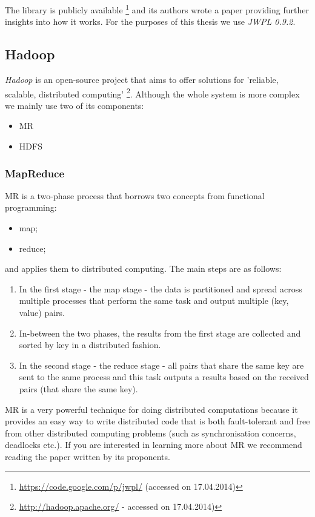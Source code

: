 The library is publicly available
\footnote{\url{https://code.google.com/p/jwpl/} (accessed on 17.04.2014)} and
its authors wrote a paper \cite{zesch2008jwpl} providing further insights into
how it works. For the purposes of this thesis we use \emph{\ac{JWPL} 0.9.2}.

\subsection{Hadoop}

\emph{Hadoop} is an open-source project that aims to offer solutions for
'reliable, scalable, distributed computing'
\footnote{\url{http://hadoop.apache.org/} - accessed on 17.04.2014)}.  Although
the whole system is more complex we mainly use two of its components:
\begin{itemize}
  \item \acl{MR}
  \item \acl{HDFS}
\end{itemize}

\subsubsection{MapReduce}

\acf{MR} is a two-phase process that borrows two concepts from functional
programming:
\begin{itemize}
  \item map;
  \item reduce;
\end{itemize}
and applies them to distributed computing.
The main steps are as follows:
\begin{enumerate}
  \item In the first stage - the map stage - the data is partitioned and spread
  across multiple processes that perform the same task and output multiple
  (key, value) pairs.
  \item In-between the two phases, the results from the first stage are
  collected and sorted by key in a distributed fashion.
  \item In the second stage - the reduce stage - all pairs that share the same
  key are sent to the same process and this task outputs a results based on the
  received pairs (that share the same key).
\end{enumerate}
\acf{MR} is a very powerful technique for doing distributed computations
because it provides an easy way to write distributed code that is both
fault-tolerant and free from other distributed computing problems (such as
synchronisation concerns, deadlocks etc.).
If you are interested in learning more about \acf{MR} we recommend reading the
paper \cite{dean2008mapreduce} written by its proponents.

